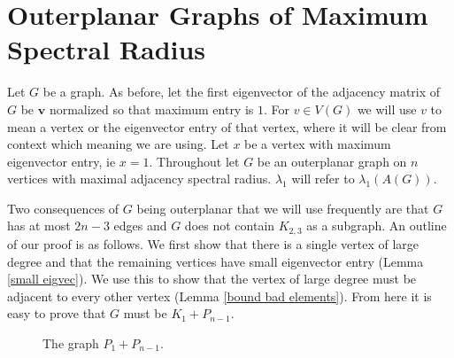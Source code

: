 \section{Outerplanar Graphs of Maximum Spectral Radius}\label{outerplanar}
Let $G$ be a graph. As before, let the first eigenvector of the adjacency matrix of $G$ be $\textbf{v}$ normalized so that maximum entry is $1$. For $v\in V(G)$ we will use $v$ to mean a vertex or the eigenvector entry of that vertex, where it will be clear from context which meaning we are using. Let $x$ be a vertex with maximum eigenvector entry, ie $x=1$.  Throughout let $G$ be an outerplanar graph on $n$ vertices with maximal adjacency spectral radius.  $\lambda_1$ will refer to $\lambda_1(A(G))$. 

Two consequences of $G$ being outerplanar that we will use frequently are that $G$ has at most $2n-3$ edges and $G$ does not contain $K_{2,3}$ as a subgraph. An outline of our proof is as follows. We first show that there is a single vertex of large degree and that the remaining vertices have small eigenvector entry (Lemma \ref{small eigvec}). We use this to show that the vertex of large degree must be adjacent to every other vertex (Lemma \ref{bound bad elements}). From here it is easy to prove that $G$ must be $K_1+P_{n-1}$.

\begin{figure}[]
\begin{center}
\begingroup

\setlength{\unitlength}{.01cm}
{
\setlength{\fboxsep}{10pt}
}
\endgroup
\end{center}
\caption{The graph $P_1 + P_{n-1}$.
   \label{fig-pn4}}
\end{figure}


